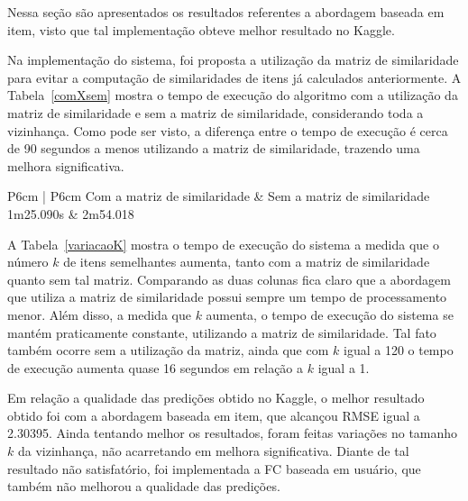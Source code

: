 \documentclass[brazil,a4paper,11pt]{article}
\begin{document}
Nessa seção são apresentados os resultados referentes a abordagem baseada em item, visto que tal implementação obteve melhor resultado no Kaggle.

Na implementação do sistema, foi proposta a utilização da matriz de similaridade para evitar a computação de similaridades de itens já calculados anteriormente. A Tabela~\ref{comXsem} mostra o tempo de execução do algoritmo com a utilização da matriz de similaridade e sem a matriz de similaridade, considerando toda a vizinhança. Como pode ser visto, a diferença entre o tempo de execução é cerca de 90 segundos a menos utilizando a matriz de similaridade, trazendo uma melhora significativa.

\begin{table}[!t]
  \centering
  \begin{tabular}{P{6cm} | P{6cm} }
  \hline\hline
  Com a matriz de similaridade & Sem a matriz de similaridade \\
       1m25.090s          &   2m54.018   \\ \hline\hline
  \end{tabular}
    \caption{Tempo de execução com e sem a matriz de similaridade, considerando toda a vizinhança.}
      \label{comXsem}
\end{table}

A Tabela~\ref{variacaoK} mostra o tempo de execução do sistema a medida que o número $k$ de itens semelhantes aumenta, tanto com a matriz de similaridade quanto sem tal matriz. Comparando as duas colunas fica claro que a abordagem que utiliza a matriz de similaridade possui sempre um tempo de processamento menor. Além disso, a medida que $k$ aumenta, o tempo de execução do sistema se mantém praticamente constante, utilizando a matriz de similaridade. Tal fato também ocorre sem a utilização da matriz, ainda que com $k$ igual a 120 o tempo de execução aumenta quase 16 segundos em relação a $k$ igual a 1. 

Em relação a qualidade das predições obtido no Kaggle, o melhor resultado obtido foi com a abordagem baseada em item, que alcançou RMSE igual a 2.30395. Ainda tentando melhor os resultados, foram feitas variações no tamanho $k$ da vizinhança, não acarretando em melhora significativa. Diante de tal resultado não satisfatório, foi implementada a FC baseada em usuário, que também não melhorou a qualidade das predições. 
\end{document}
